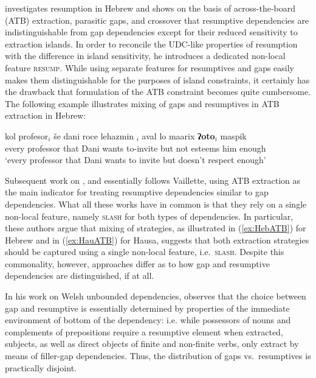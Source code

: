 \documentclass[output=paper
	        ,collection
	        ,collectionchapter
 	        ,biblatex
                ,babelshorthands
                ,newtxmath
                ,draftmode
                ,colorlinks, citecolor=brown
]{langscibook}
\begin{document}
{\citet{Vaillette:01} investigates resumption in Hebrew and shows on
the basis of across-the-board (ATB) extraction, parasitic gaps, and
crossover that resumptive dependencies are indistinguishable from gap
dependencies except for their reduced sensitivity to extraction
islands. In order to reconcile the UDC-like properties of resumption
with the difference in island sensitivity, he introduces a dedicated
non-local feature \textsc{resump}. While using separate features for
resumptives and gaps easily makes them distinguishable for the
purposes of island constraints, it certainly has the drawback that
formulation of the ATB constraint becomes quite cumbersome.
The following example illustrates mixing of gaps and resumptives in
ATB extraction in Hebrew: 

\begin{exe}
  \ex \label{ex:HebATB}{\gll kol
profesor$_i$ še dani roce lehazmin \trace{}$_i$ aval lo maarix \textbf{ʔoto}$_i$ maspik
\\
every professor that Dani wants to-invite {} but not
esteems him enough\\
\glt `every professor that Dani wants to invite but doesn’t respect
enough'\hfill\citep[78]{sells_p84}}
\end{exe}

\noindent
Subsequent work on  \citep{taghvaipour:phd:05}, 
\citep{Borsley:13} and  \citep{Crysmann:12} essentially follows
Vaillette, using ATB extraction as the main indicator for treating
resumptive dependencies similar to gap dependencies. What all these
works have in common is that they rely on a single non-local
feature, namely \textsc{slash} for both types of dependencies. In
particular, these authors argue that mixing of strategies, as
illustrated in (\ref{ex:HebATB}) for Hebrew and in (\ref{ex:HauATB})
for Hausa, suggests that both extraction
strategies should be captured using a single non-local feature,
i.e.\ \textsc{slash}. Despite this commonality, however, approaches
differ as to how gap and resumptive dependencies are distinguished, if
at all.

In his work on Welsh unbounded dependencies, \citet{Borsley:10}
observes that the choice between gap and resumptive is essentially
determined by properties of the immediate environment of bottom of the
dependency: i.e. while possessors of nouns and complements of
prepositions require a resumptive element when extracted, subjects, as
well as direct objects of finite and non-finite verbs, only extract by
means of filler-gap dependencies. Thus, the distribution of gaps vs.\
resumptives is practically disjoint.

}
\end{document}
